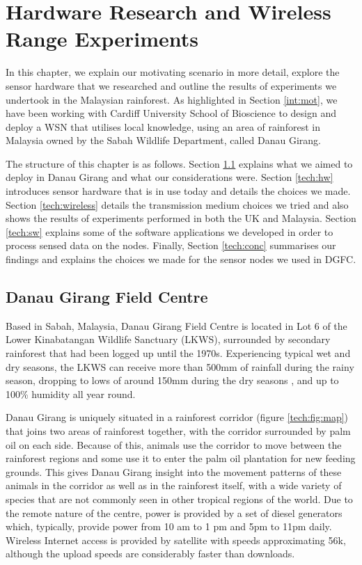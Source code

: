 \chapter{Hardware Research and Wireless Range Experiments}\label{chap:technical}
	In this chapter, we explain our motivating scenario in more detail, explore the sensor hardware that we researched and outline the results of experiments we undertook in the Malaysian rainforest. As highlighted in Section \ref{int:mot}, we have been working with Cardiff University School of Bioscience to design and deploy a WSN that utilises local knowledge, using an area of rainforest in Malaysia owned by the Sabah Wildlife Department, called Danau Girang.

The structure of this chapter is as follows. Section \ref{tech:motiv} explains what we aimed to deploy in Danau Girang and what our considerations were. Section \ref{tech:hw} introduces sensor hardware that is in use today and details the choices we made. Section \ref{tech:wireless} details the transmission medium choices we tried and also shows the results of experiments performed in both the UK and Malaysia. Section \ref{tech:sw} explains some of the software applications we developed in order to process sensed data on the nodes. Finally, Section \ref{tech:conc} summarises our findings and explains the choices we made for the sensor nodes we used in DGFC. 

\section{Danau Girang Field Centre}\label{tech:motiv}
Based in Sabah, Malaysia, Danau Girang Field Centre is located in Lot 6 of the Lower Kinabatangan Wildlife Sanctuary (LKWS), surrounded by secondary rainforest that had been logged up until the 1970s. Experiencing typical wet and dry seasons, the LKWS can receive more than 500mm of rainfall during the rainy season, dropping to lows of around 150mm during the dry seasons \cite{Walsh2009}, and up to 100\% humidity all year round. 

Danau Girang is uniquely situated in a rainforest corridor (figure \ref{tech:fig:map}) that joins two areas of rainforest together, with the corridor surrounded by palm oil on each side. Because of this, animals use the corridor to move between the rainforest regions and some use it to enter the palm oil plantation for new feeding grounds. This gives Danau Girang insight into the movement patterns of these animals in the corridor as well as in the rainforest itself, with a wide variety of species that are not commonly seen in other tropical regions of the world. Due to the remote nature of the centre, power is provided by a set of diesel generators which, typically, provide power from 10 am to 1 pm and 5pm to 11pm daily. Wireless Internet access is provided by satellite with speeds approximating 56k, although the upload speeds are considerably faster than downloads.

